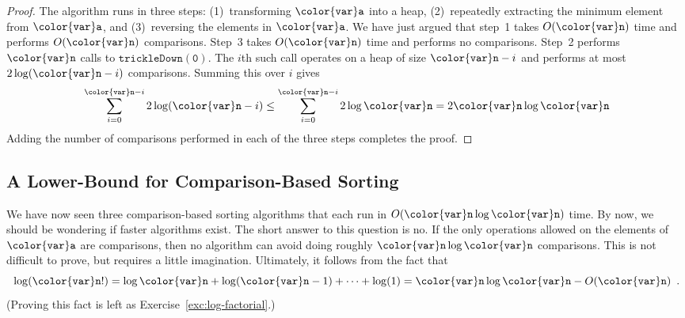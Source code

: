 \documentclass[10pt]{book}
\theoremstyle{plain}
\theoremstyle{definition}
\newcommand{\excref}[1]{Exercise~\ref{exc:#1}}
\begin{document}
\begin{proof}
The algorithm runs in three steps:  (1)~transforming \ensuremath{\mathtt{{\color{var}a}}} into a heap,
(2)~repeatedly extracting the minimum element from \ensuremath{\mathtt{{\color{var}a}}}, and (3)~reversing
the elements in \ensuremath{\mathtt{{\color{var}a}}}.  We have just argued that step~1 takes $O(\ensuremath{\mathtt{{\color{var}n}}})$
time and performs $O(\ensuremath{\mathtt{{\color{var}n}}})$ comparisons.  Step~3 takes $O(\ensuremath{\mathtt{{\color{var}n}}})$ time and
performs no comparisons.  Step~2 performs \ensuremath{\mathtt{{\color{var}n}}} calls to \ensuremath{\mathtt{trickleDown(0)}}.
The $i$th such call operates on a heap of size $\ensuremath{\mathtt{{\color{var}n}}}-i$ and performs
at most $2\log(\ensuremath{\mathtt{{\color{var}n}}}-i)$ comparisons.  Summing this over $i$ gives
\[
   \sum_{i=0}^{\ensuremath{\mathtt{{\color{var}n}}}-i} 2\log(\ensuremath{\mathtt{{\color{var}n}}}-i) 
   \le \sum_{i=0}^{\ensuremath{\mathtt{{\color{var}n}}}-i} 2\log \ensuremath{\mathtt{{\color{var}n}}}
   =  2\ensuremath{\mathtt{{\color{var}n}}}\log \ensuremath{\mathtt{{\color{var}n}}}
\]
Adding the number of comparisons performed in each of the three steps
completes the proof.
\end{proof}

\subsection{A Lower-Bound for Comparison-Based Sorting}

%
%
We have now seen three comparison-based sorting algorithms that each run
in $O(\ensuremath{\mathtt{{\color{var}n}}}\log \ensuremath{\mathtt{{\color{var}n}}})$ time.  By now, we should be wondering if faster
algorithms exist.  The short answer to this question is no.  If the
only operations allowed on the elements of \ensuremath{\mathtt{{\color{var}a}}} are comparisons, then no
algorithm can avoid doing roughly $\ensuremath{\mathtt{{\color{var}n}}}\log \ensuremath{\mathtt{{\color{var}n}}}$ comparisons.  This is
not difficult to prove, but requires a little imagination.  Ultimately,
it follows from the fact that
\[
   \log(\ensuremath{\mathtt{{\color{var}n}}}!) 
     = \log \ensuremath{\mathtt{{\color{var}n}}} + \log (\ensuremath{\mathtt{{\color{var}n}}}-1) + \dots + \log(1) 
     = \ensuremath{\mathtt{{\color{var}n}}}\log \ensuremath{\mathtt{{\color{var}n}}} - O(\ensuremath{\mathtt{{\color{var}n}}})
    \enspace .
\]
(Proving this fact is left as \excref{log-factorial}.)
\end{document}
